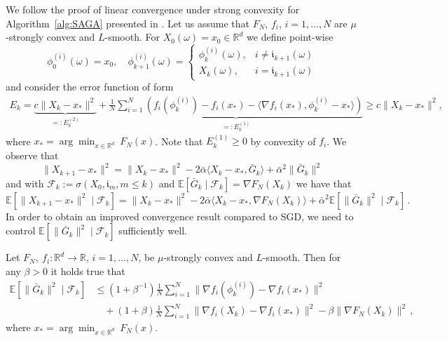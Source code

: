 \documentclass[12pt,openany]{book}
\theoremstyle{definition}
\theoremstyle{definition}
\newcommand{\cF}{\mathcal{F}}
\newcommand{\E}{\mathbb{E}}
\newcommand{\R}{\mathbb{R}}
\begin{document}
We follow the proof of linear convergence under strong convexity for Algorithm~\ref{alg:SAGA} presented in \cite{NIPS2014_ede7e2b6}. Let us assume that $F_N$, $f_i$, $i=1,\dots,N$ are $\mu$-strongly convex and $L$-smooth. For $X_0(\omega) = x_0\in\R^d$ we define point-wise
\[ \phi_0^{(i)}(\omega) = x_0,\quad \phi_{k+1}^{(i)}(\omega) = \begin{cases} \phi_k^{(i)}(\omega), & i\neq \mathfrak i_{k+1}(\omega)\\ X_k(\omega), &i=\mathfrak i_{k+1}(\omega) \end{cases} \]
and consider the error function of form
\begin{align*}
E_k = \underbrace{c\|X_k-x_\ast\|^2}_{=:E_k^{(2)}} + \underbrace{\frac1N\sum_{i=1}^N \left( f_i(\phi_k^{(i)})-f_i(x_\ast) - \langle \nabla f_i(x_\ast), \phi_k^{(i)}-x_\ast\rangle\right)}_{=:E_k^{(1)}}\ge c\|X_k-x_\ast\|^2,
\end{align*}
where $x_\ast = \arg\min_{x\in\R^d}\ F_N(x)$. Note that $E_k^{(1)}\ge0$ by convexity of $f_i$. We observe that
\[\|X_{k+1}-x_\ast\|^2 = \|X_k-x_\ast\|^2 - 2\bar\alpha\langle X_k-x_\ast,\bar G_k\rangle +\bar\alpha^2 \|\bar G_k\|^2 \]
and with $\cF_k:=\sigma(X_0,\mathfrak i_m,m\le k)$ and $\E[\bar G_k\mid\cF_k] = \nabla F_N(X_k)$ we have that
\[\E[\|X_{k+1}-x_\ast\|^2\mid \cF_k] = \|X_k-x_\ast\|^2 -2\bar\alpha \langle X_k-x_\ast, \nabla F_N(X_k)\rangle + \bar\alpha^2 \E[\|\bar G_k\|^2\mid \cF_k]\,.\]
In order to obtain an improved convergence result compared to SGD, we need to control $\E[\|\bar G_k\|^2\mid \cF_k]$ sufficiently well.
\begin{lemma}\label{lem:varred}
Let $F_N,\ f_i:\R^d\to\R$, $i=1,\dots,N$, be $\mu$-strongly convex and $L$-smooth. Then for any $\beta>0$ it holds true that 
\begin{align*}
\E[\|\bar G_k\|^2\mid \cF_k] &\le (1+\beta^{-1}) \frac1N\sum_{i=1}^N \|\nabla f_i(\phi_k^{(i)})-\nabla f_i(x_\ast)\|^2\\&\quad + (1+\beta) \frac{1}{N}\sum_{i=1}^N \|\nabla f_i(X_k)-\nabla f_i(x_\ast)\|^2 - \beta\|\nabla F_N(X_k)\|^2\,,
\end{align*}
where $x_\ast =\arg\min_{x\in\R^d}\ F_N(x)$.
\end{lemma}
\end{document}
